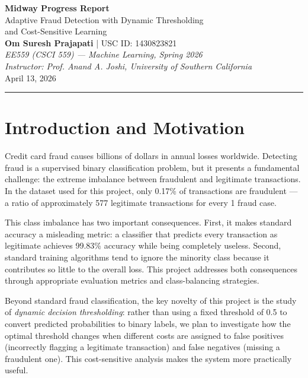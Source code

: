 \documentclass[11pt, a4paper]{article}
\begin{document}
\begin{center}
    {\LARGE \textbf{Midway Progress Report}}\\[0.4em]
    {\large Adaptive Fraud Detection with Dynamic Thresholding\\
    and Cost-Sensitive Learning}\\[0.6em]
    \textbf{Om Suresh Prajapati} \quad | \quad USC ID: 1430823821\\[0.2em]
    \textit{EE559 (CSCI 559) — Machine Learning, Spring 2026}\\[0.2em]
    \textit{Instructor: Prof. Anand A. Joshi, University of Southern California}\\[0.2em]
    April 13, 2026
\end{center}

\vspace{0.3em}
\hrule
\vspace{0.6em}

\section{Introduction and Motivation}

Credit card fraud causes billions of dollars in annual losses worldwide. Detecting fraud
is a supervised binary classification problem, but it presents a fundamental challenge:
the extreme imbalance between fraudulent and legitimate transactions. In the dataset used
for this project, only 0.17\% of transactions are fraudulent — a ratio of approximately
577 legitimate transactions for every 1 fraud case.

This class imbalance has two important consequences. First, it makes standard accuracy a
misleading metric: a classifier that predicts every transaction as legitimate achieves
99.83\% accuracy while being completely useless. Second, standard training algorithms tend
to ignore the minority class because it contributes so little to the overall loss. This
project addresses both consequences through appropriate evaluation metrics and
class-balancing strategies.

Beyond standard fraud classification, the key novelty of this project is the study of
\textit{dynamic decision thresholding}: rather than using a fixed threshold of 0.5 to
convert predicted probabilities to binary labels, we plan to investigate how the optimal
threshold changes when different costs are assigned to false positives (incorrectly flagging
a legitimate transaction) and false negatives (missing a fraudulent one). This
cost-sensitive analysis makes the system more practically useful.
\end{document}
